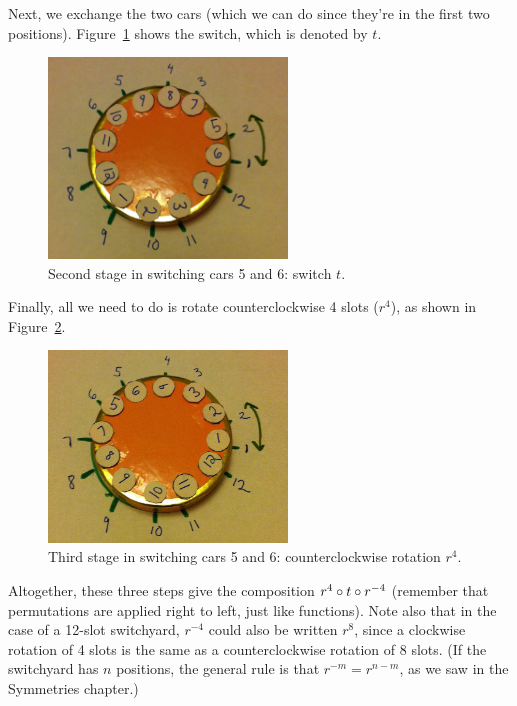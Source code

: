 Next, we exchange the two cars (which we can do since they're in the first two positions). Figure~\ref{fig:switchyard_t} shows the switch, which is denoted by $t$.
\begin{figure}[ht]
\begin{center}
\includegraphics[width=2.5in]{images/switchyard_t.jpg}
\caption{Second stage in switching cars 5 and 6: switch $t$.}\label{fig:switchyard_t}
\end{center}
\end{figure} 

Finally, all we need to do is rotate counterclockwise 4 slots ($r^4$), as shown in Figure~\ref{fig:switchyardCCL4}.
\begin{figure}[ht]
\begin{center}
\includegraphics[width=2.5in]{images/switchyardCCL4.jpg}
\caption{Third stage in switching cars 5 and 6: counterclockwise rotation $r^{4}$.}\label{fig:switchyardCCL4}
\end{center}
\end{figure} 

Altogether, these three steps give the composition $r^4 \circ t \circ r^{-4}$ (remember that permutations are applied right to left, just like functions).  Note also that in the case of a 12-slot switchyard, $r^{-4}$ could also be written $r^8$, since a clockwise rotation of 4 slots is the same as a counterclockwise rotation of 8 slots.  (If the switchyard has $n$ positions, the general rule is that $r^{-m} = r^{n-m}$, as we saw in the Symmetries chapter.)

